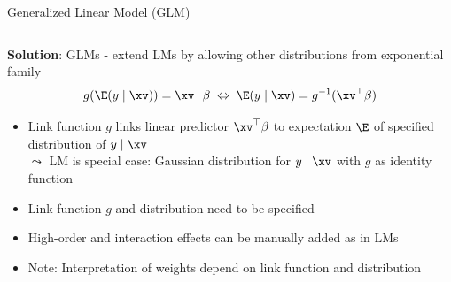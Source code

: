 \documentclass[11pt,compress,t,notes=noshow, aspectratio=169, xcolor=table]{beamer}
\begin{document}
\begin{frame}{Generalized Linear Model (GLM) }
\begin{columns}
\begin{column}{0.4\textwidth}
\begin{center}
        \end{center}
    \end{column}
\end{columns}
\medskip
\pause
\textbf{Solution}: GLMs - extend LMs by allowing other distributions from exponential family
$$g(\E (y \mid \xv)) = \xv^\top \beta \; \Leftrightarrow \; \E (y \mid \xv) = g^{-1}(\xv^\top \beta)$$
\vspace*{-0.5cm}
    \begin{itemize}[<+->]
        \item Link function $g$ links linear predictor $\xv^\top \beta$ to expectation $\E$ of specified distribution of $y \mid \xv$\\
        $\leadsto$ LM is special case: Gaussian distribution for $y \mid \xv$ with $g$ as identity function 
        \item Link function $g$ and distribution need to be specified 
        \item High-order and interaction effects can be manually added as in LMs
        \item Note: Interpretation of weights depend on link function and distribution
    \end{itemize}
\end{frame}
 	
\end{document}
